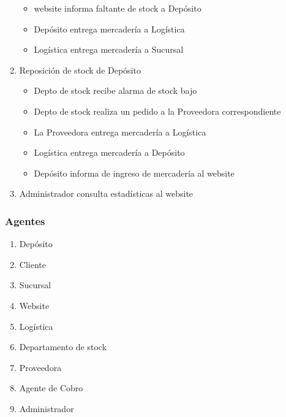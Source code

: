 \begin{enumerate}
\begin{itemize}
    \item website informa faltante de stock a Depósito

    \item Depósito entrega mercadería a Logística

    \item Logística entrega mercadería a Sucursal

  \end{itemize}

  \item Reposición de stock de Depósito

  \begin{itemize}

    \item Depto de stock recibe alarma de stock bajo 

    \item Depto de stock realiza un pedido a la Proveedora correspondiente

    \item La Proveedora entrega mercadería a Logística

    \item Logística entrega mercadería a Depósito

    \item Depósito informa de ingreso de mercadería al website

  \end{itemize}

  \item Administrador consulta estadísticas al website

\end{enumerate}

\subsubsection{Agentes}

\begin{enumerate}
  \item Depósito
  \item Cliente
  \item Sucursal
  \item Website
  \item Logística
  \item Departamento de stock 
  \item Proveedora
  \item Agente de Cobro
  \item Administrador
\end{enumerate}

